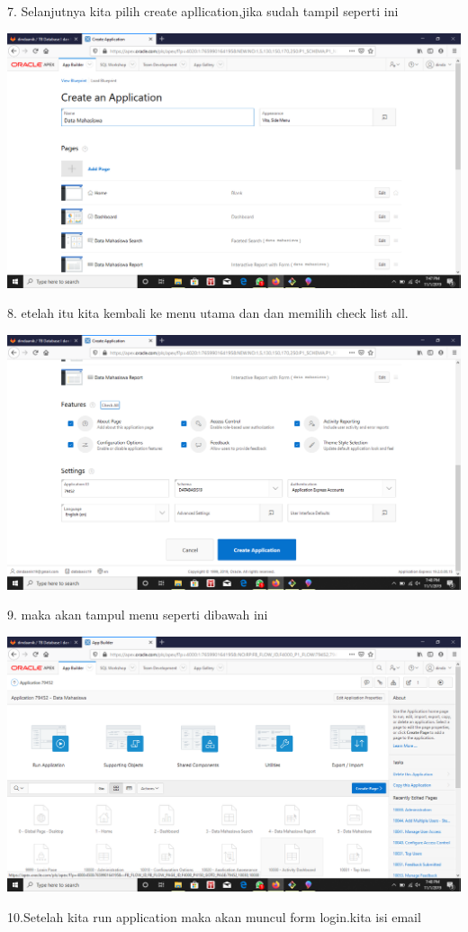 \documentclass{article}
\begin{document}
\newpage
\item 7. Selanjutnya kita pilih create apllication,jika sudah tampil seperti ini 
\begin{center}
 \includegraphics[width=10cm\textwidth]{gambar/8.png}
\end{center}
\item 8. etelah itu kita kembali ke menu utama dan dan memilih check list all.
\begin{center}
 \includegraphics[width=10cm\textwidth]{gambar/9.png}
\end{center}
\item 9. maka akan tampul menu seperti dibawah ini
\begin{center}
 \includegraphics[width=10cm\textwidth]{gambar/10.png}
\end{center}
\item 10.Setelah kita run application maka akan muncul form login.kita isi email
\end{document}
